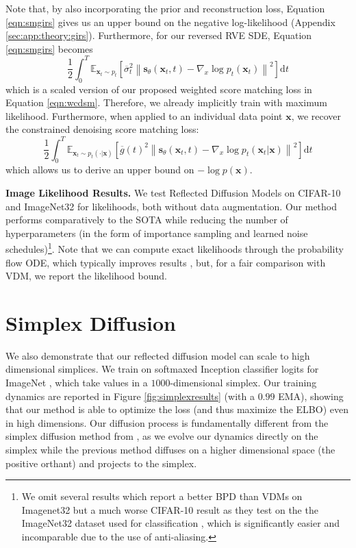 \documentclass{article}
\theoremstyle{plain}
\theoremstyle{definition}
\theoremstyle{remark}
\newcommand{\E}{\mathbb{E}}
\newcommand{\sqbrac}[1]{\left[#1\right]}
\newcommand{\norm}[1]{\left\|#1\right\|}
\newcommand{\grad}{\nabla}
\renewcommand{\vec}{\mathbf}
\newcommand{\dd}{\mathrm{d}}
\begin{document}
Note that, by also incorporating the prior and reconstruction loss, Equation \ref{eqn:smgirs} gives us an upper bound on the negative log-likelihood (Appendix \ref{sec:app:theory:girs}). Furthermore, for our reversed RVE SDE, Equation \ref{eqn:smgirs} becomes
\begin{equation}
    \frac{1}{2} \int_0^T \E_{\vec{x}_t \sim p_t}\sqbrac{\overline{\sigma}_t^2 \norm{\vec{s}_\theta(\vec{x}_t, t) - \grad_x \log p_t(\vec{x}_t)}^2} \dd t
\end{equation}
which is a scaled version of our proposed weighted score matching loss in Equation \ref{eqn:wcdsm}. Therefore, we already implicitly train with maximum likelihood. Furthermore, when applied to an individual data point $\vec{x}$, we recover the constrained denoising score matching loss:
\begin{equation}
    \frac{1}{2} \int_0^T \E_{\vec{x}_t \sim p_t(\cdot | \vec{x})}\sqbrac{\overline{g}(t)^2 \norm{\vec{s}_\theta(\vec{x}_t, t) - \grad_x \log p_t(\vec{x}_t | \vec{x})}^2} \dd t
\end{equation}
which allows us to derive an upper bound on $-\log p(\vec{x})$.

\textbf{Image Likelihood Results.} We test Reflected Diffusion Models on CIFAR-10 \citep{Krizhevsky2009LearningML} and ImageNet32 \citep{Oord2016PixelRN} for likelihoods, both without data augmentation. Our method performs comparatively to the SOTA while reducing the number of hyperparameters (in the form of importance sampling and learned noise schedules)\footnote{We omit several results which report a better BPD than VDMs \citep{Kingma2021VariationalDM} on Imagenet32 but a much worse CIFAR-10 result as they test on the the ImageNet32 dataset used for classification \citep{Chrabaszcz2017ADV}, which is significantly easier and incomparable due to the use of anti-aliasing.}. Note that we can compute exact likelihoods through the probability flow ODE, which typically improves results \citep{Song2021MaximumLT}, but, for a fair comparison with VDM, we report the likelihood bound.
 \section{Simplex Diffusion}

We also demonstrate that our reflected diffusion model can scale to high dimensional simplices. We train on softmaxed Inception classifier logits for ImageNet \citep{Szegedy2014GoingDW}, which take values in a $1000$-dimensional simplex. Our training dynamics are reported in Figure \ref{fig:simplexresults} (with a $0.99$ EMA), showing that our method is able to optimize the loss (and thus maximize the ELBO) even in high dimensions. Our diffusion process is fundamentally different from the simplex diffusion method from \citet{Richemond2022CategoricalSW}, as we evolve our dynamics directly on the simplex while the previous method diffuses on a higher dimensional space (the positive orthant) and projects to the simplex.
\end{document}
